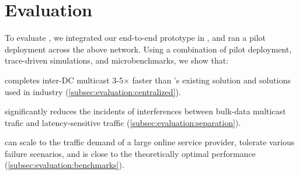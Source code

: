 \section{Evaluation}
\label{sec:evaluation}

To evaluate \name, we integrated our end-to-end prototype in \company, and ran a pilot deployment across the above network.
Using a combination of pilot deployment, trace-driven simulations, and microbenchmarks, we show that:
\begin{packedenumerate}
\item \name completes inter-DC multicast 3-5$\times$ faster than \company's existing solution and solutions used in industry (\Section\ref{subsec:evaluation:centralized}).
\item \name significantly reduces the incidents of interferences between bulk-data multicast trafic and latency-sensitive traffic (\Section\ref{subsec:evaluation:separation}).
\item \name can scale to the traffic demand of a large online service provider, tolerate various failure scenarios, and is close to the theoretically optimal performance (\Section\ref{subsec:evaluation:benchmarks}).
\end{packedenumerate}

